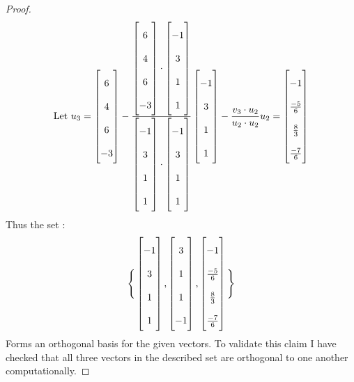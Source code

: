 \documentclass[12pt]{article}
\begin{document}
\begin{proof}
  \[
  \text{Let } u_3=\begin{bmatrix}
      6\\4\\6\\-3
  \end{bmatrix}-\frac{{\begin{bmatrix}
    6\\4\\6\\-3
  \end{bmatrix}\cdot  \begin{bmatrix}
      -1\\3\\1\\1
  \end{bmatrix}}}{\begin{bmatrix}
        -1\\3\\1\\1
    \end{bmatrix}\cdot \begin{bmatrix}
          -1\\3\\1\\1
      \end{bmatrix}}\begin{bmatrix}
            -1\\3\\1\\1
        \end{bmatrix}-\frac{v_3\cdot u_2}{u_2 \cdot u_2}u_2=  \renewcommand\arraystretch{2}\begin{bmatrix}
          -1\\\frac{-5}{6}\\\frac{8}{3}\\\frac{-7}{6}
      \end{bmatrix}
  \]
  Thus the set :
  \[
    \Bigg\{\begin{bmatrix}
      -1\\3\\1\\1
  \end{bmatrix},\begin{bmatrix}
    3\\1\\1\\-1
  \end{bmatrix},\renewcommand\arraystretch{2}\begin{bmatrix}
    -1\\\frac{-5}{6}\\\frac{8}{3}\\\frac{-7}{6}
\end{bmatrix}\Bigg\}
  \]
  Forms an orthogonal basis for the given vectors. To validate this claim I have checked that all three vectors in the described set are orthogonal to one another computationally.
\end{proof}
\end{document}
